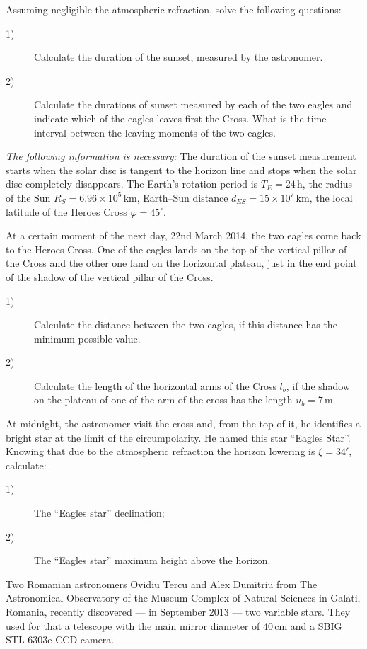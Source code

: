 \begin{description}
  Assuming negligible the atmospheric refraction, solve the following
  questions:
  \begin{description}
  \item[1)] Calculate the duration of the sunset, measured by the astronomer.
  \item[2)] Calculate the durations of sunset measured by each of the two
    eagles and indicate which of the eagles leaves first the Cross. What is
    the time interval between the leaving moments of the two eagles.
  \end{description}
  \emph{The following information is necessary:} The duration of the sunset
  measurement starts when the solar disc is tangent to the horizon line and
  stops when the solar disc completely disappears. The Earth's rotation period
  is $T_E = 24$\,h, the radius of the Sun $R_S = 6.96 \times 10^{5}$\,km,
  Earth--Sun distance $d_{ES} = 15 \times 10^{7}$\,km, the local latitude of
  the Heroes Cross $\varphi = 45^\circ$.
\item[B)] At a certain moment of the next day, 22nd March 2014, the two eagles
  come back to the Heroes Cross. One of the eagles lands on the top of the
  vertical pillar of the Cross and the other one land on the horizontal
  plateau, just in the end point of the shadow of the vertical pillar of the
  Cross.
  \begin{description}
  \item[1)] Calculate the distance between the two eagles, if this distance
    has the minimum possible value.
  \item[2)] Calculate the length of the horizontal arms of the Cross $l_b$, if
    the shadow on the plateau of one of the arm of the cross has the length
    $u_b = 7$\,m.
  \end{description}
\item[C)] At midnight, the astronomer visit the cross and, from the top of it,
  he identifies a bright star at the limit of the circumpolarity. He named
  this star ``Eagles Star''. Knowing that due to the atmospheric refraction
  the horizon lowering is $\xi = 34'$, calculate:
  \begin{description}
  \item[1)] The ``Eagles star'' declination;
  \item[2)] The ``Eagles star'' maximum height above the horizon.
  \end{description}
\end{description}

Two Romanian astronomers Ovidiu Tercu and Alex Dumitriu from The Astronomical
Observatory of the Museum Complex of Natural Sciences in Galati, Romania,
recently discovered --- in September 2013 --- two variable stars. They used
for that a telescope with the main mirror diameter of 40\,cm and a SBIG
STL-6303e CCD camera.


